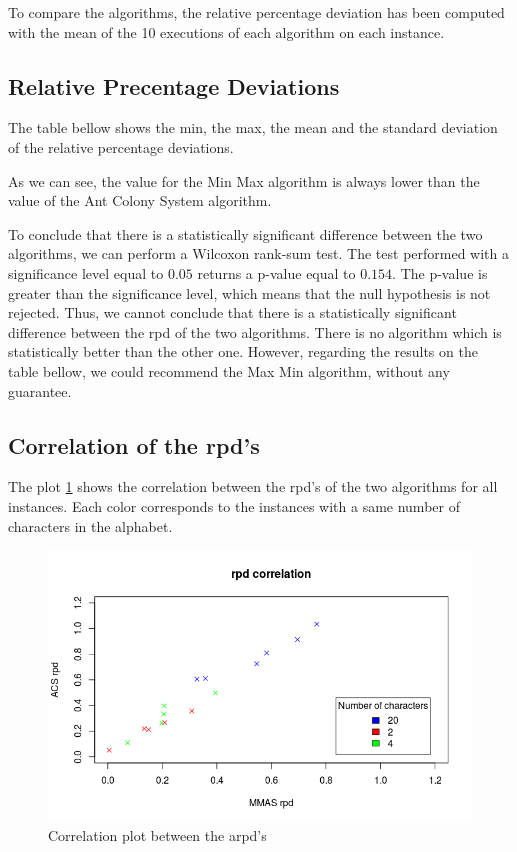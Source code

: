 \documentclass{article}
\begin{document}
To compare the algorithms, the relative percentage deviation has been computed with the mean of the 10 executions of each algorithm on each instance.

\subsection{Relative Precentage Deviations}

The table bellow shows the min, the max, the mean and the standard deviation of the relative percentage deviations.

As we can see, the value for the Min Max algorithm is always lower than the value of the Ant Colony System algorithm. \newline

To conclude that there is a statistically significant difference between the two algorithms, we can perform a Wilcoxon rank-sum test.
The test performed with a significance level equal to $0.05$ returns a p-value equal to $0.154$.
The p-value is greater than the significance level, which means that the null hypothesis is not rejected.
Thus, we cannot conclude that there is a statistically significant difference between the rpd of the two algorithms.
There is no algorithm which is statistically better than the other one.
However, regarding the results on the table bellow, we could recommend the Max Min algorithm, without any guarantee.

\subsection{Correlation of the rpd's}

The plot \ref{fig:corr} shows the correlation between the rpd's of the two algorithms for all instances.
Each color corresponds to the instances with a same number of characters in the alphabet. \newline

\begin{figure}
    \centering
        \includegraphics[scale=0.5]{correl}
    \caption{Correlation plot between the arpd's}
    \label{fig:corr}
\end{figure}
\end{document}
